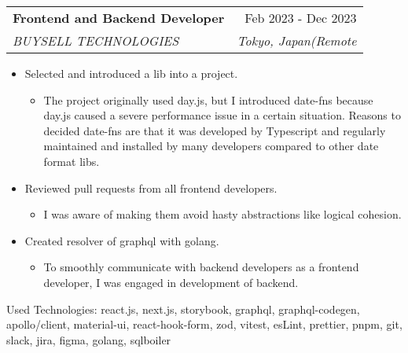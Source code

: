 \documentclass[letterpaper,11pt]{article}
\makeatletter
\newcommand{\resumeItem}[1]{
  \item\large{
    {#1 \vspace{0pt}}
  }
}
\newcommand{\resumeSubheading}[4]{
  \vspace{-2pt}\item
    \begin{tabular*}{0.97\textwidth}[t]{l@{\extracolsep{\fill}}r}
      \textbf{#1} & #2 \\
      \textit{\small#3} & \textit{\small #4} \\
    \end{tabular*}\vspace{-7pt}
}
\makeatother
\begin{document}
    \resumeSubheading
      {Frontend and Backend Developer}{Feb 2023 - Dec 2023}
      {BUYSELL TECHNOLOGIES}{Tokyo, Japan(Remote}
      \begin{itemize}
        \resumeItem{Selected and introduced a lib into a project.}
        \begin{itemize}
          \item {The project originally used day.js, but I introduced date-fns because day.js caused a severe performance issue in a certain situation. Reasons to decided date-fns are that it was developed by Typescript and regularly maintained and installed by many developers compared to other date format libs.}
        \end{itemize}
        \resumeItem{Reviewed pull requests from all frontend developers.}
        \begin{itemize}
          \item {I was aware of making them avoid hasty abstractions like logical cohesion.}
        \end{itemize}
        \resumeItem{Created resolver of graphql with golang.}
        \begin{itemize}
          \item {To smoothly communicate with backend developers as a frontend developer, I was engaged in development of backend.}
        \end{itemize}
      \end{itemize}
      {Used Technologies: react.js, next.js, storybook, graphql, graphql-codegen, apollo/client, material-ui, react-hook-form, zod, vitest, esLint, prettier, pnpm, git, slack, jira, figma, golang, sqlboiler}
\end{document}
